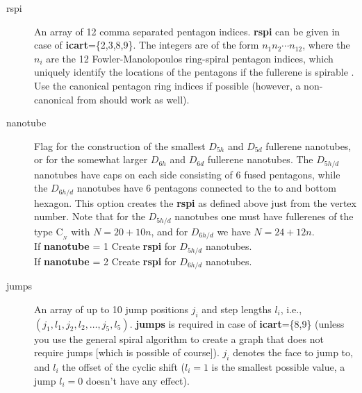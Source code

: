 \documentclass[article,a4paper,twoside]{memoir}
\newcommand{\C}[1]{\ensuremath{\mathrm{C}_{#1}}}
\newcommand{\paramname}[1]{{\color{green}\textbf{#1}}}
\begin{document}
\begin{description}
\item[{rspi}] An array of 12 comma separated pentagon indices.  \paramname{rspi} can be given in case of \paramname{icart}=\{2,3,8,9\}.
The integers are of the form $n_1 n_2 \cdots n_{12}$, where the $n_i$ are the 12 Fowler-Manolopoulos ring-spiral
pentagon indices, which uniquely identify the locations of the
pentagons if the fullerene is spirable \cite{Atlas}. Use the canonical
pentagon ring indices if possible (however, a non-canonical from should work as well).

\item[{nanotube}] Flag for the construction of the smallest $D_{5h}$ and $D_{5d}$ fullerene nanotubes, or for the somewhat larger
$D_{6h}$ and $D_{6d}$ fullerene nanotubes. The $D_{5h/d}$ nanotubes have caps on each side consisting of 6 fused pentagons, while
the $D_{6h/d}$ nanotubes have 6 pentagons connected to the to and bottom hexagon. This option creates the \paramname{rspi} as defined above
just from the vertex number. Note that for the $D_{5h/d}$ nanotubes one must have fullerenes of the type \C{_N} with $N=20+10n$, and
for $D_{6h/d}$ we have $N=24+12n$.\\
If \paramname{nanotube} = 1 Create \paramname{rspi} for $D_{5h/d}$ nanotubes.\\
If \paramname{nanotube} = 2 Create \paramname{rspi} for $D_{6h/d}$ nanotubes.

\item[jumps] An array of up to 10 jump positions $j_i$ and step lengths
$l_i$, i.e., $(j_1,l_1,j_2,l_2,\ldots,j_5,l_5)$.  
\paramname{jumps} is required in case of \paramname{icart}=\{8,9\}
(unless you use the general spiral algorithm to create a graph that does not require jumps [which is possible of course]).
$j_i$ denotes the face to jump to, and $l_i$ the offset of the cyclic
shift ($l_i=1$ is the smallest possible value, a jump $l_i=0$ doesn't
have any effect).



\end{description}
\end{document}
